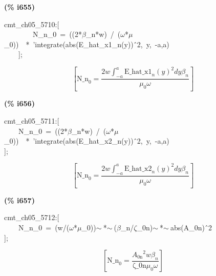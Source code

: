 \documentclass[fleqn]{article}
\begin{document}
\noindent
\begin{minipage}[t]{4.000000em}\color{red}\bfseries
(\% i655)	
\end{minipage}
\begin{minipage}[t]{\textwidth}\color{blue}
cmt\_ch05\_5710:[\\
\ \ \ \ \ \ \ \ N\_n\_0\ =\ ((2*\ensuremath{\beta}\_n*w)\ /\ (\ensuremath{\omega}*\ensuremath{\mu}\_0))\ \ *\ 'integrate(abs(E\_hat\_x1\_n(y))\^\ 2,\ y,\ -a,a)\\
\ \ \ \ ];
\end{minipage}
\[\displaystyle \tag{\% o655} 
\left[ {{\ensuremath{\mathrm{N\_ n}}}_0}=\frac{2 w \int_{-a}^{a}{\left. {{{{\ensuremath{\mathrm{E\_ hat\_ x1}}}_n}(y)}^{2}}dy\right.} {{\beta }_n}}{{{\mu }_0} \omega }\right] \mbox{}
\]


\noindent
\begin{minipage}[t]{4.000000em}\color{red}\bfseries
(\% i656)	
\end{minipage}
\begin{minipage}[t]{\textwidth}\color{blue}
cmt\_ch05\_5711:[\\
\ \ \ \ N\_n\_0\ =\ ((2*\ensuremath{\beta}\_n*w)\ /\ (\ensuremath{\omega}*\ensuremath{\mu}\_0))\ \ *\ 'integrate(abs(E\_hat\_x2\_n(y))\^\ 2,\ y,\ -a,a)\\
];
\end{minipage}
\[\displaystyle \tag{\% o656} 
\left[ {{\ensuremath{\mathrm{N\_ n}}}_0}=\frac{2 w \int_{-a}^{a}{\left. {{{{\ensuremath{\mathrm{E\_ hat\_ x2}}}_n}(y)}^{2}}dy\right.} {{\beta }_n}}{{{\mu }_0} \omega }\right] \mbox{}
\]


\noindent
\begin{minipage}[t]{4.000000em}\color{red}\bfseries
(\% i657)	
\end{minipage}
\begin{minipage}[t]{\textwidth}\color{blue}
cmt\_ch05\_5712:[\\
\ \ \ \ N\_n\_0\ =\ (w/(\ensuremath{\omega}*\ensuremath{\mu}\_0))\ensuremath{\sim\ }*\ensuremath{\sim\ }(\ensuremath{\beta}\_n/\ensuremath{\zeta}\_0n)\ensuremath{\sim\ }*\ensuremath{\sim\ }abs(A\_0n)\^\ 2\\
];
\end{minipage}
\[\displaystyle \tag{\% o657} 
\left[ {{\ensuremath{\mathrm{N\_ n}}}_0}=\frac{{{{A_{\ensuremath{\mathrm{0n}}}}}^{2}} w {{\beta }_n}}{\ensuremath{\mathrm{\zeta \_ 0n}} {{\mu }_0} \omega }\right] \mbox{}
\]
\end{document}
